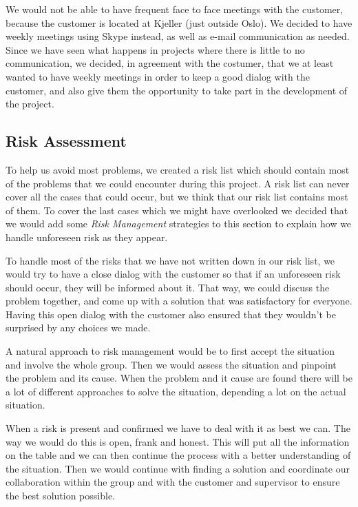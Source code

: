     We would not be able to have frequent face to face meetings with the customer, because the customer is located at Kjeller (just outside Oslo). We decided to have weekly meetings using Skype instead, as well as e-mail communication as needed. Since we have seen what happens in projects where there is little to no communication, we decided, in agreement with the costumer, that we at least wanted to have weekly meetings in order to keep a good dialog with the customer, and also give them the opportunity to take part in the development of the project. 
    
    
    \subsection{Risk Assessment}\label{Risk Assessment}
     To help us avoid most problems, we created a risk list which should contain most of the problems that we could encounter during this project. A risk list can never cover all the cases that could occur, but we think that our risk list contains most of them. To cover the last cases which we might have overlooked we decided that we would add some \textit{Risk Management} strategies to this section to explain how we handle unforeseen risk as they appear. 
     
     To handle most of the risks that we have not written down in our risk list, we would try to have a close dialog with the customer so that if an unforeseen risk should occur, they will be informed about it. That way, we could discuss the problem together, and come up with a solution that was satisfactory for everyone. Having this open dialog with the customer also ensured that they wouldn't be surprised by any choices we made.
     
    A natural approach to risk management would be to first accept the situation and involve the whole group. Then we would assess the situation and pinpoint the problem and its cause. When the problem and it cause are found there will be a lot of different approaches to solve the situation, depending a lot on the actual situation. 
    
    When a risk is present and confirmed we have to deal with it as best we can. The way we would do this is open, frank and honest. This will put all the information on the table and we can then continue the process with a better understanding of the situation. Then we would continue with finding a solution and coordinate our collaboration within the group and with the customer and supervisor to ensure the best solution possible.

